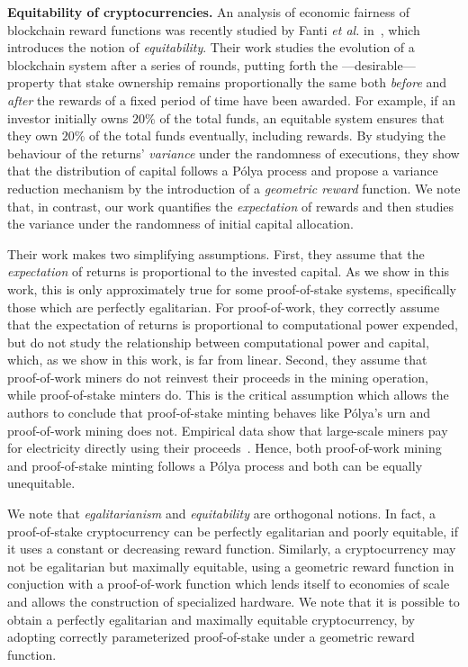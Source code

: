 \noindent\textbf{Equitability of cryptocurrencies.}
An analysis of economic fairness of
blockchain reward functions was recently studied by Fanti \textit{et al.} in~\cite{equitability}, which
introduces the notion of \emph{equitability}. Their work studies the evolution
of a blockchain system after a series of rounds, putting forth the
---desirable--- property that stake ownership remains proportionally the same
both \emph{before} and \emph{after} the rewards of a fixed period of time have been awarded.
For example, if an
investor initially owns $20\%$ of the total funds, an equitable system ensures that they
own $20\%$ of the total funds eventually, \ie including
rewards. By studying the behaviour of the returns' \emph{variance} under the randomness of executions,
they show that the distribution of capital
follows a Pólya process and propose a variance reduction mechanism
by the introduction of a \emph{geometric reward} function.
We note that, in contrast, our work quantifies the \emph{expectation} of rewards
 and then studies the variance under the
randomness of initial capital allocation.

Their work makes two simplifying assumptions.
First, they assume that the \emph{expectation} of returns is proportional to the
invested capital. As we show in this work, this is only
approximately true for some proof-of-stake systems, specifically those which are perfectly egalitarian. For proof-of-work, they
correctly assume that the expectation of returns is proportional to computational
power expended, but do not study the relationship between computational power and
capital, which, as we show in this work, is far from linear. Second, they assume that
proof-of-work miners do not reinvest their proceeds in the
mining operation, while proof-of-stake minters do.
This is the critical assumption which allows the authors to
conclude that proof-of-stake minting behaves like Pólya's urn and
proof-of-work mining does not. Empirical data show that large-scale miners pay for electricity
directly using their proceeds~\cite{kharif2018}. Hence, both proof-of-work mining
and proof-of-stake minting follows a Pólya process and both can be equally unequitable.

We note that \emph{egalitarianism} and \emph{equitability} are orthogonal
notions. In fact, a proof-of-stake cryptocurrency can be perfectly egalitarian
and poorly equitable, \eg if it uses a constant or decreasing reward function.
Similarly, a cryptocurrency may not be egalitarian but maximally equitable, \eg
using a geometric reward function in conjuction with a proof-of-work function
which lends itself to economies of scale and allows the construction of
specialized hardware.
We note that it is possible to obtain a perfectly egalitarian and maximally
equitable cryptocurrency, \eg by adopting
correctly parameterized proof-of-stake under a geometric reward function.
